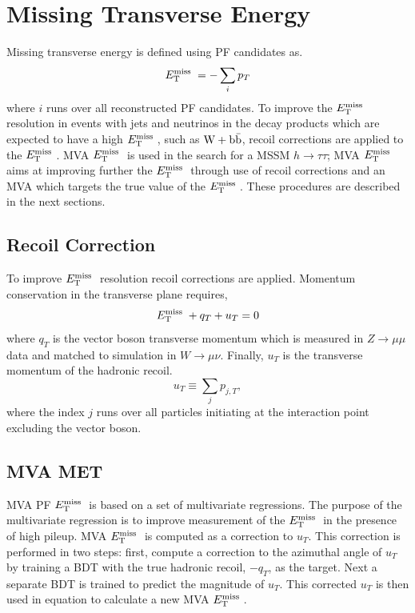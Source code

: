 \section{Missing Transverse Energy}
Missing transverse energy is defined using PF candidates as.
\begin{equation}%
\MET = -\sum_{i} p_{T}
\end{equation}
where $i$ runs over all reconstructed PF candidates. 
To improve the $E_\mathrm{T}^{\mathrm{miss}}\;$ resolution in 
events with jets and neutrinos in the decay products 
which are expected to have a high $E_\mathrm{T}^{\mathrm{miss}}\;$, such as $\mathrm{W+\mathrm{b\bar{b}}}$,
recoil corrections are applied to the $E_\mathrm{T}^{\mathrm{miss}}\;$. MVA 
$E_\mathrm{T}^{\mathrm{miss}}\;$ is used in the search for a MSSM $h\rightarrow\tau\tau$;
MVA $E_\mathrm{T}^{\mathrm{miss}}\;$ aims at improving further the $E_\mathrm{T}^{\mathrm{miss}}\;$
through use of recoil corrections and an MVA which targets the true value of the $E_\mathrm{T}^{\mathrm{miss}}\;$.
These procedures are described in the next sections.
\subsection{Recoil Correction}
To improve $E_\mathrm{T}^{\mathrm{miss}}\;$ resolution recoil corrections are applied. 
Momentum conservation in the transverse plane requires,
\begin{equation}
E_\mathrm{T}^{\mathrm{miss}}\;+q_{T}+u_{T}=0
\end{equation}
where $q_{T}$ is the vector boson transverse momentum which is measured
in $Z\rightarrow\mu\mu$ data and matched to simulation in $W\rightarrow\mu\nu$.
Finally, $u_{T}$ is the transverse momentum of the hadronic recoil.
\begin{equation}
u_{T}\equiv\sum_{j} p_{j,T},
\end{equation}
where the index $j$ runs over all particles initiating at the interaction point excluding
the vector boson. 

\subsection{MVA MET}
MVA PF $E_\mathrm{T}^{\mathrm{miss}}\;$ is based on a set of multivariate regressions.
The purpose of the multivariate regression is to improve measurement of the $E_\mathrm{T}^{\mathrm{miss}}\;$
in the presence of high pileup.
MVA $E_\mathrm{T}^{\mathrm{miss}}\;$ is computed as a correction to $u_{T}$. This correction
is performed in two steps: %
first, compute a correction to the azimuthal angle
of $u_{T}$ by training a BDT with the true hadronic recoil, $-q_{T}$, as the target. Next
 a separate BDT is trained to predict the magnitude of $u_{T}$. This corrected
 $u_{T}$ is then used in equation %
 to calculate a new MVA $E_\mathrm{T}^{\mathrm{miss}}\;$. %
